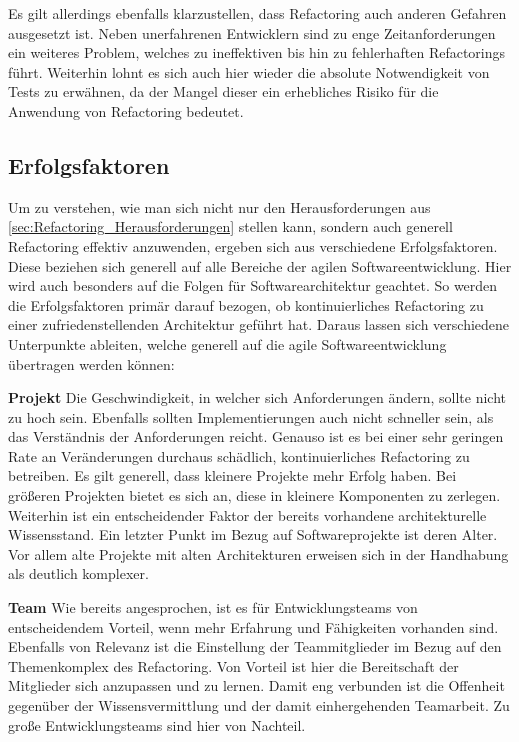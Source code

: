 \documentclass[acmtog]{acmart}
\begin{document}
Es gilt allerdings ebenfalls klarzustellen, dass Refactoring auch anderen Gefahren ausgesetzt ist. Neben unerfahrenen Entwicklern sind zu enge Zeitanforderungen ein weiteres Problem, welches zu ineffektiven bis hin zu fehlerhaften Refactorings führt. Weiterhin lohnt es sich auch hier wieder die absolute Notwendigkeit von Tests zu erwähnen, da der Mangel dieser ein erhebliches Risiko für die Anwendung von Refactoring bedeutet. \cite{articlePerspectives}


\subsection{Erfolgsfaktoren}\label{sec:Refactoring_Erfolgsfaktoren}

Um zu verstehen, wie man sich nicht nur den Herausforderungen aus \ref{sec:Refactoring_Herausforderungen} stellen kann, sondern auch generell Refactoring effektiv anzuwenden, ergeben sich aus \cite{6827119} verschiedene Erfolgsfaktoren. Diese beziehen sich generell auf alle Bereiche der agilen Softwareentwicklung. Hier wird auch besonders auf die Folgen für Softwarearchitektur geachtet. So werden die Erfolgsfaktoren primär darauf bezogen, ob kontinuierliches Refactoring zu einer zufriedenstellenden Architektur geführt hat. Daraus lassen sich verschiedene Unterpunkte ableiten, welche generell auf die agile Softwareentwicklung übertragen werden können:

\textbf{Projekt}
Die Geschwindigkeit, in welcher sich Anforderungen ändern, sollte nicht zu hoch sein. Ebenfalls sollten Implementierungen auch nicht schneller sein, als das Verständnis der Anforderungen reicht. Genauso ist es bei einer sehr geringen Rate an Veränderungen durchaus schädlich, kontinuierliches Refactoring zu betreiben.
Es gilt generell, dass kleinere Projekte mehr Erfolg haben. Bei größeren Projekten bietet es sich an, diese in kleinere Komponenten zu zerlegen.
Weiterhin ist ein entscheidender Faktor der bereits vorhandene architekturelle Wissensstand.
Ein letzter Punkt im Bezug auf Softwareprojekte ist deren Alter. Vor allem alte Projekte mit alten Architekturen erweisen sich in der Handhabung als deutlich komplexer.

\textbf{Team}
Wie bereits angesprochen, ist es für Entwicklungsteams von entscheidendem Vorteil, wenn mehr Erfahrung und Fähigkeiten vorhanden sind.
Ebenfalls von Relevanz ist die Einstellung der Teammitglieder im Bezug auf den Themenkomplex des Refactoring. Von Vorteil ist hier die Bereitschaft der Mitglieder sich anzupassen und zu lernen. Damit eng verbunden ist die Offenheit gegenüber der Wissensvermittlung und der damit einhergehenden Teamarbeit.
Zu große Entwicklungsteams sind hier von Nachteil.
\end{document}
